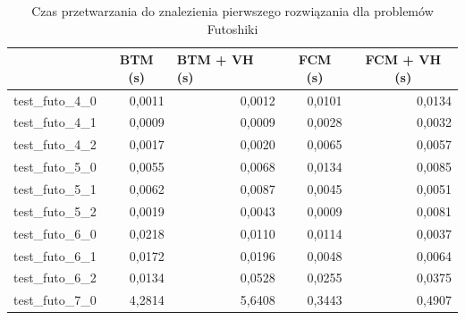 \documentclass{article}
\begin{document}
\begin{table}[H]
	\caption{Czas przetwarzania do znalezienia pierwszego rozwiązania dla problemów Futoshiki}
	\label{tab:vh_no_mrv}
	\begin{center}
		\begin{tabular}{|l|r|r|r|r|}
			\hline
			& \multicolumn{1}{c|}{\textbf{BTM (s)}} & \multicolumn{1}{l|}{\textbf{BTM + VH (s)}} & \multicolumn{1}{c|}{\textbf{FCM (s)}} & \multicolumn{1}{c|}{\textbf{FCM + VH (s)}} \\ \hline
			test\_futo\_4\_0 & 0,0011                            & 0,0012                                 & 0,0101                            & 0,0134                                 \\ \hline
			test\_futo\_4\_1 & 0,0009                            & 0,0009                                 & 0,0028                            & 0,0032                                 \\ \hline
			test\_futo\_4\_2 & 0,0017                            & 0,0020                                 & 0,0065                            & 0,0057                                 \\ \hline
			test\_futo\_5\_0 & 0,0055                            & 0,0068                                 & 0,0134                            & 0,0085                                 \\ \hline
			test\_futo\_5\_1 & 0,0062                            & 0,0087                                 & 0,0045                            & 0,0051                                 \\ \hline
			test\_futo\_5\_2 & 0,0019                            & 0,0043                                 & 0,0009                            & 0,0081                                 \\ \hline
			test\_futo\_6\_0 & 0,0218                            & 0,0110                                 & 0,0114                            & 0,0037                                 \\ \hline
			test\_futo\_6\_1 & 0,0172                            & 0,0196                                 & 0,0048                            & 0,0064                                 \\ \hline
			test\_futo\_6\_2 & 0,0134                            & 0,0528                                 & 0,0255                            & 0,0375                                 \\ \hline
			test\_futo\_7\_0 & 4,2814                            & 5,6408                                 & 0,3443                            & 0,4907                                 \\ \hline

\end{tabular}
\end{center}
\end{table}
\end{document}
